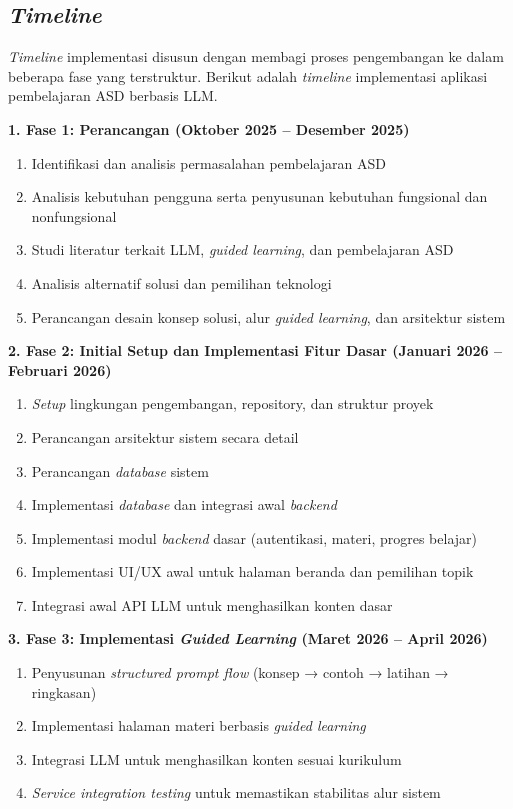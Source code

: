 \subsection{\textit{Timeline}}

\textit{Timeline} implementasi disusun dengan membagi proses pengembangan 
ke dalam beberapa fase yang terstruktur. Berikut adalah \textit{timeline} 
implementasi aplikasi pembelajaran ASD berbasis LLM.

\textbf{1. Fase 1: Perancangan (Oktober 2025 – Desember 2025)}
\begin{enumerate}[label=\alph*.]
    \item Identifikasi dan analisis permasalahan pembelajaran ASD
    \item Analisis kebutuhan pengguna serta penyusunan kebutuhan fungsional dan nonfungsional
    \item Studi literatur terkait LLM, \textit{guided learning}, dan pembelajaran ASD
    \item Analisis alternatif solusi dan pemilihan teknologi
    \item Perancangan desain konsep solusi, alur \textit{guided learning}, dan arsitektur sistem
\end{enumerate}

\textbf{2. Fase 2: Initial Setup dan Implementasi Fitur Dasar (Januari 2026 – Februari 2026)}
\begin{enumerate}[label=\alph*.]
    \item \textit{Setup} lingkungan pengembangan, repository, dan struktur proyek
    \item Perancangan arsitektur sistem secara detail
    \item Perancangan \textit{database} sistem
    \item Implementasi \textit{database} dan integrasi awal \textit{backend}
    \item Implementasi modul \textit{backend} dasar (autentikasi, materi, progres belajar)
    \item Implementasi UI/UX awal untuk halaman beranda dan pemilihan topik
    \item Integrasi awal API LLM untuk menghasilkan konten dasar
\end{enumerate}

\textbf{3. Fase 3: Implementasi \textit{Guided Learning} (Maret 2026 – April 2026)}
\begin{enumerate}[label=\alph*.]
    \item Penyusunan \textit{structured prompt flow} (konsep → contoh → latihan → ringkasan)
    \item Implementasi halaman materi berbasis \textit{guided learning}
    \item Integrasi LLM untuk menghasilkan konten sesuai kurikulum
    \item \textit{Service integration testing} untuk memastikan stabilitas alur sistem
\end{enumerate}

